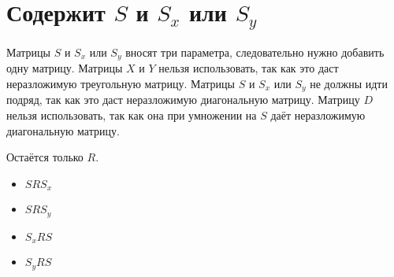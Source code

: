 \section{Содержит $S$ и $S_x$ или $S_y$}

Матрицы $S$ и $S_x$ или $S_y$ вносят три параметра, следовательно нужно добавить одну матрицу.
Матрицы $X$ и $Y$ нельзя использовать, так как это даст неразложимую треугольную матрицу.
Матрицы $S$ и $S_x$ или $S_y$ не должны идти подряд, так как это даст неразложимую диагональную матрицу.
Матрицу $D$ нельзя использовать, так как она при умножении на $S$ даёт неразложимую диагональную матрицу.

Остаётся только $R$.

\begin{itemize}
	\item $S R S_x$
	\item $S R S_y$
	\item $S_x R S$
	\item $S_y R S$
\end{itemize}